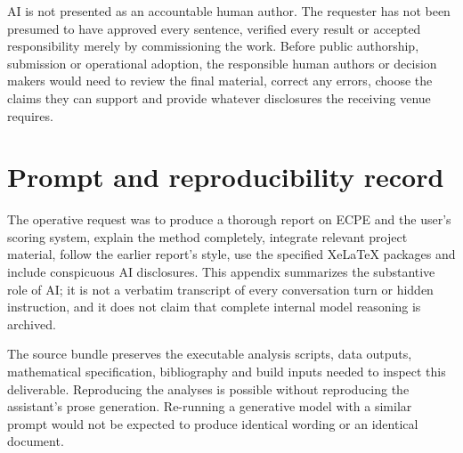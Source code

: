 \documentclass[11pt,a4paper,oneside,headings=normal,parskip=half]{scrreprt}
\begin{document}
AI is not presented as an accountable human author. The requester has not been presumed to have approved every sentence, verified every result or accepted responsibility merely by commissioning the work. Before public authorship, submission or operational adoption, the responsible human authors or decision makers would need to review the final material, correct any errors, choose the claims they can support and provide whatever disclosures the receiving venue requires.

\section{Prompt and reproducibility record}
The operative request was to produce a thorough report on ECPE and the user's scoring system, explain the method completely, integrate relevant project material, follow the earlier report's style, use the specified XeLaTeX packages and include conspicuous AI disclosures. This appendix summarizes the substantive role of AI; it is not a verbatim transcript of every conversation turn or hidden instruction, and it does not claim that complete internal model reasoning is archived.

The source bundle preserves the executable analysis scripts, data outputs, mathematical specification, bibliography and build inputs needed to inspect this deliverable. Reproducing the analyses is possible without reproducing the assistant's prose generation. Re-running a generative model with a similar prompt would not be expected to produce identical wording or an identical document.
\end{document}
